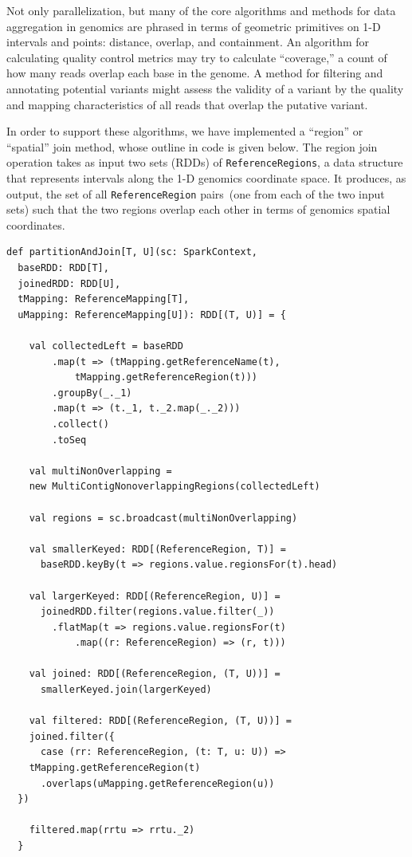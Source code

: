 \documentclass{acm_proc_article-sp}
\begin{document}
Not only parallelization, but many of the core algorithms and methods for data aggregation in genomics
are phrased in terms of geometric primitives on 1-D intervals and points: distance, overlap, and
containment.  An algorithm for calculating quality control metrics may try to calculate ``coverage,'' a count
of how many reads overlap each base in the genome. A method for filtering and annotating potential
variants might assess the validity of a variant by the quality and mapping characteristics of all reads
that overlap the putative variant.

In order to support these algorithms, we have implemented a ``region'' or ``spatial'' join  method, whose
outline in code is given below. The region join operation takes as input two sets (RDDs) of
\texttt{ReferenceRegions}, a data structure that represents intervals along the 1-D genomics coordinate
space. It produces, as output, the set of all \texttt{ReferenceRegion} pairs~(one from each of the two
input sets) such that the two regions overlap each other in terms of genomics spatial coordinates. 

\begin{lstlisting}
def partitionAndJoin[T, U](sc: SparkContext,
  baseRDD: RDD[T],
  joinedRDD: RDD[U],
  tMapping: ReferenceMapping[T],
  uMapping: ReferenceMapping[U]): RDD[(T, U)] = {

    val collectedLeft = baseRDD
        .map(t => (tMapping.getReferenceName(t), 
			tMapping.getReferenceRegion(t))) 
        .groupBy(_._1) 
        .map(t => (t._1, t._2.map(_._2))) 
        .collect() 
        .toSeq 

    val multiNonOverlapping = 
	new MultiContigNonoverlappingRegions(collectedLeft)

    val regions = sc.broadcast(multiNonOverlapping)

    val smallerKeyed: RDD[(ReferenceRegion, T)] =
      baseRDD.keyBy(t => regions.value.regionsFor(t).head)

    val largerKeyed: RDD[(ReferenceRegion, U)] =
      joinedRDD.filter(regions.value.filter(_))
        .flatMap(t => regions.value.regionsFor(t)
			.map((r: ReferenceRegion) => (r, t)))

    val joined: RDD[(ReferenceRegion, (T, U))] =
      smallerKeyed.join(largerKeyed)

    val filtered: RDD[(ReferenceRegion, (T, U))] = 
	joined.filter({
	  case (rr: ReferenceRegion, (t: T, u: U)) =>
    tMapping.getReferenceRegion(t)
      .overlaps(uMapping.getReferenceRegion(u))
  })

    filtered.map(rrtu => rrtu._2)
  }
\end{lstlisting}
\end{document}
